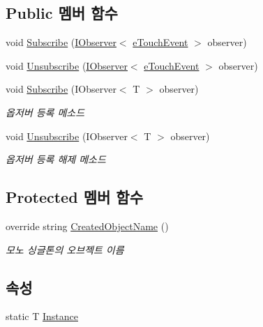 \subsection*{Public 멤버 함수}
\begin{DoxyCompactItemize}
\item 
void \hyperlink{class_touch_manager_aa68342b07f75f8eda3b420e07f9e4c7b}{Subscribe} (\hyperlink{interface_m_c_n_1_1_i_observer}{I\+Observer}$<$ \hyperlink{_touch_manager_8cs_ae33e321a424fe84ba8b2fdb81ad40a68}{e\+Touch\+Event} $>$ observer)
\item 
void \hyperlink{class_touch_manager_a2c4ace4b27bef64c2e9496240ee4d676}{Unsubscribe} (\hyperlink{interface_m_c_n_1_1_i_observer}{I\+Observer}$<$ \hyperlink{_touch_manager_8cs_ae33e321a424fe84ba8b2fdb81ad40a68}{e\+Touch\+Event} $>$ observer)
\item 
void \hyperlink{interface_m_c_n_1_1_i_observable_a84e57296a612a2d49afbcc7f841ceb0b}{Subscribe} (I\+Observer$<$ T $>$ observer)
\begin{DoxyCompactList}\small\item\em 옵저버 등록 메소드 \end{DoxyCompactList}\item 
void \hyperlink{interface_m_c_n_1_1_i_observable_a3ff752d344f0b610b1146af7a0fbf067}{Unsubscribe} (I\+Observer$<$ T $>$ observer)
\begin{DoxyCompactList}\small\item\em 옵저버 등록 해제 메소드 \end{DoxyCompactList}\end{DoxyCompactItemize}
\subsection*{Protected 멤버 함수}
\begin{DoxyCompactItemize}
\item 
override string \hyperlink{class_touch_manager_a8fb5460d8904a0c1a6453b5c49dc3cb4}{Created\+Object\+Name} ()
\begin{DoxyCompactList}\small\item\em 모노 싱글톤의 오브젝트 이름 \end{DoxyCompactList}\end{DoxyCompactItemize}
\subsection*{속성}
\begin{DoxyCompactItemize}
\item 
static T \hyperlink{class_m_c_n_1_1_mono_singletone_aa50c027cca64cf4ad30c1ee5c83e0b78}{Instance}
\end{DoxyCompactItemize}
